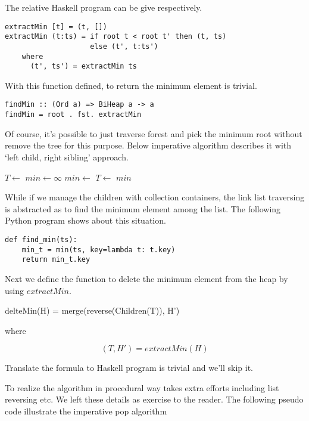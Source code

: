 \documentclass{article}
\begin{document}
The relative Haskell program can be give respectively.

\lstset{language=Haskell}
\begin{lstlisting}
extractMin [t] = (t, [])
extractMin (t:ts) = if root t < root t' then (t, ts)
                    else (t', t:ts')
    where
      (t', ts') = extractMin ts
\end{lstlisting}

With this function defined, to return the minimum element is trivial.

\begin{lstlisting}
findMin :: (Ord a) => BiHeap a -> a
findMin = root . fst. extractMin
\end{lstlisting}

Of course, it's possible to just traverse forest and pick the
minimum root without remove the tree for this purpose. Below
imperative algorithm describes it with `left child, right sibling'
approach.

\begin{algorithmic}[1]
  \State $T \gets $ 
  \State $min \gets \infty$
      \State $min \gets $ 
    \EndIf
    \State $T \gets $ 
  \EndWhile
  \State \Return $min$
\EndFunction
\end{algorithmic}

While if we manage the children with collection containers, the link
list traversing is abstracted as to find the minimum element among the list.
The following Python program shows about this situation.

\lstset{language=Python}
\begin{lstlisting}
def find_min(ts):
    min_t = min(ts, key=lambda t: t.key)
    return min_t.key
\end{lstlisting}

Next we define the function to delete the minimum element from
the heap by using $extractMin$.

\be
delteMin(H) = merge(reverse(Children(T)), H')
\ee

where

\[
  (T, H') = extractMin(H)
\]

Translate the formula to Haskell program is trivial and we'll skip
it.

To realize the algorithm in procedural way takes extra efforts
including list reversing etc. We left these details as exercise to the
reader. The following pseudo code illustrate the imperative
pop algorithm
\end{document}
